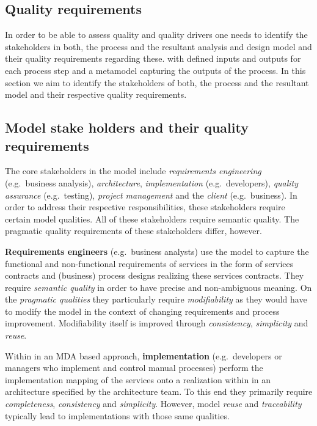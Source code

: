 \subsection{Quality requirements}


In order to be able to assess quality and quality drivers one needs to identify the stakeholders in both, the process and the resultant analysis and design model and their quality requirements regarding these.
with defined inputs and outputs for each process step and a metamodel capturing the outputs of the process. In this section we aim to identify the stakeholders of both, the process and the resultant model and their respective quality requirements.

\subsection{Model stake holders and their quality requirements}

The core stakeholders in the model include \emph{requirements engineering} (e.g.\ business analysis), \emph{architecture}, \emph{implementation} (e.g.\ developers), \emph{quality assurance} (e.g.\ testing), \emph{project management} and the \emph{client} (e.g.\ business). In order to address their respective responsibilities, these stakeholders require certain model qualities. All of these stakeholders require semantic quality. The pragmatic quality requirements of these stakeholders differ, however.

{\bf Requirements engineers} (e.g.\ business analysts) use the model to capture the functional and non-functional requirements of  services in the form of services contracts and (business) process designs realizing these services contracts. They require \emph{semantic quality} in order to have precise and non-ambiguous meaning. On the \emph{pragmatic qualities} they particularly require \emph{modifiability} as they would have to modify the model in the context of changing requirements and process improvement. Modifiability itself is improved through \emph{consistency}, \emph{simplicity} and \emph{reuse}. 

Within in an MDA based approach, {\bf implementation} (e.g.\ developers or managers who implement and control manual processes) perform the implementation mapping of the services onto a realization within in an architecture specified by the architecture team. To this end they primarily require \emph{completeness}, \emph{consistency} and \emph{simplicity}. However, model \emph{reuse} and \emph{traceability} typically lead to implementations with those same qualities.

